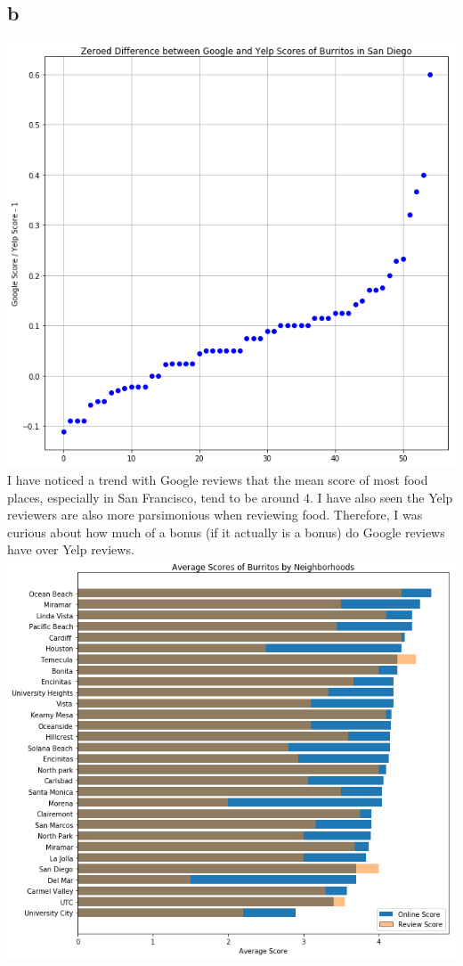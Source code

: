 \documentclass[twoside]{homework}
\begin{document}
\subsection*{b}
\includegraphics[scale=0.8]{5a}
I have noticed a trend with Google reviews that the mean score of most food places, especially in San Francisco, tend to be around 4. I have also seen the Yelp reviewers are also more parsimonious when reviewing food. Therefore, I was curious about how much of a bonus (if it actually is a bonus) do Google reviews have over Yelp reviews.
\\
\includegraphics[scale=0.8]{5b}
\end{document}
